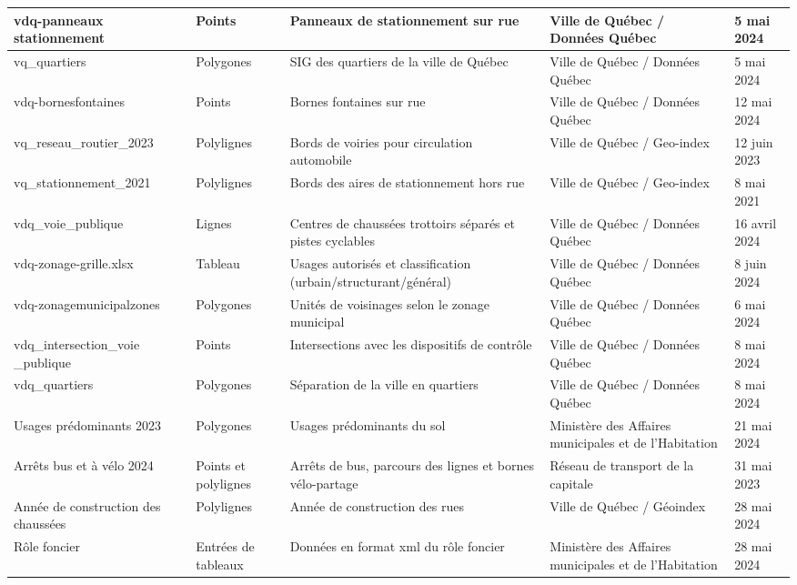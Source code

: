 \begin{landscape}
\begin{longtable}[h!]{p{.2 \linewidth} p{.1 \linewidth} p{.3 \linewidth} p{.15\linewidth} p{.125\linewidth} }
    
    vdq-panneaux stationnement    & Points        & Panneaux de stationnement sur rue          & Ville de Québec / Données Québec  & 5 mai 2024 \\
    \hline
    vq\_quartiers & Polygones & SIG des quartiers de la ville de Québec & Ville de Québec / Données Québec & 5 mai 2024 \\
    \hline
    vdq-bornesfontaines          & Points        & Bornes fontaines sur rue                   & Ville de Québec / Données Québec & 12 mai 2024 \\
    \hline
    vq\_reseau\_routier\_2023 & Polylignes    & Bords de voiries pour circulation automobile  & Ville de Québec / Geo-index  & 12 juin 2023\\ 
    \hline
    vq\_stationnement\_2021  & Polylignes    & Bords des aires de stationnement hors rue & Ville de Québec / Geo-index & 8 mai 2021\\
    \hline
    vdq\_voie\_publique            & Lignes        & Centres de chaussées trottoirs séparés et pistes cyclables & Ville de Québec / Données Québec & 16 avril 2024 \\
    \hline
    vdq-zonage-grille.xlsx          & Tableau        & Usages autorisés et classification (urbain/structurant/général) & Ville de Québec / Données Québec & 8 juin 2024 \\
    \hline
    vdq-zonagemunicipalzones          & Polygones        & Unités de voisinages selon le zonage municipal & Ville de Québec / Données Québec & 6 mai 2024 \\
    \hline
    vdq\_intersection\_voie \_publique & Points & Intersections avec les dispositifs de contrôle & Ville de Québec / Données Québec & 8 mai 2024 \\
    \hline
    vdq\_quartiers & Polygones &Séparation de la ville en quartiers & Ville de Québec / Données Québec & 8 mai 2024\\
    \hline
    Usages prédominants 2023  & Polygones & Usages prédominants du sol &   Ministère des Affaires municipales et de l'Habitation & 21 mai 2024 \\
    \hline
    Arrêts bus et à vélo 2024 & Points et polylignes & Arrêts de bus, parcours des lignes et bornes vélo-partage & Réseau de transport de la capitale & 31 mai 2023 \\
    \hline
    Année de construction des chaussées & Polylignes & Année de construction des rues & Ville de Québec / Géoindex & 28 mai 2024 \\
    \hline
    Rôle foncier & Entrées de tableaux & Données en format xml du rôle foncier & Ministère des Affaires municipales et de l'Habitation & 28 mai 2024 \\

\end{longtable}
\end{landscape}
